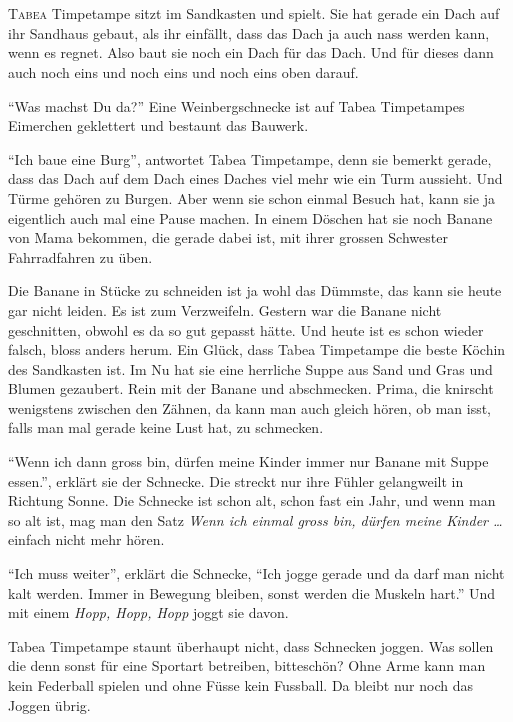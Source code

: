 \chapter*{}
\lettrine[lines=3]{\color{DeepPink}T}{abea} Timpetampe sitzt im Sandkasten und spielt. Sie hat gerade ein Dach auf ihr Sandhaus gebaut, als ihr einfällt, dass das Dach ja auch nass werden kann, wenn es regnet. Also baut sie noch ein Dach für das Dach. Und für dieses dann auch noch eins und noch eins und noch eins oben darauf.

\enquote{Was machst Du da?} Eine Weinbergschnecke ist auf Tabea Timpetampes Eimerchen geklettert und bestaunt das Bauwerk. 

\enquote{Ich baue eine Burg}, antwortet Tabea Timpetampe, denn sie bemerkt gerade, dass das Dach auf dem Dach eines Daches viel mehr wie ein Turm aussieht. Und Türme gehören zu Burgen. Aber wenn sie schon einmal Besuch hat, kann sie ja eigentlich auch mal eine Pause machen. In einem Döschen hat sie noch Banane von Mama bekommen, die gerade dabei ist, mit ihrer grossen Schwester Fahrradfahren zu üben. 

Die Banane in Stücke zu schneiden ist ja wohl das Dümmste, das kann sie heute gar nicht leiden. Es ist zum Verzweifeln. Gestern war die Banane nicht geschnitten, obwohl es da so gut gepasst hätte. Und heute ist es schon wieder falsch, bloss anders herum. Ein Glück, dass Tabea Timpetampe die beste Köchin des Sandkasten ist. Im Nu hat sie eine herrliche Suppe aus Sand und Gras und Blumen gezaubert. Rein mit der Banane und abschmecken. Prima, die knirscht wenigstens zwischen den Zähnen, da kann man auch gleich hören, ob man isst, falls man mal gerade keine Lust hat, zu schmecken.

\enquote{Wenn ich dann gross bin, dürfen meine Kinder immer nur Banane mit Suppe essen.}, erklärt sie der Schnecke. Die streckt nur ihre Fühler gelangweilt in Richtung Sonne. Die Schnecke ist schon alt, schon fast ein Jahr, und wenn man so alt ist, mag man den Satz \textit{Wenn ich einmal gross bin, dürfen meine Kinder \dots} einfach nicht mehr hören.

\enquote{Ich muss weiter}, erklärt die Schnecke, \enquote{Ich jogge gerade und da darf man nicht kalt werden. Immer in Bewegung bleiben, sonst werden die Muskeln hart.} Und mit einem \textit{Hopp, Hopp, Hopp} joggt sie  davon.

Tabea Timpetampe staunt überhaupt nicht, dass Schnecken joggen. Was sollen die denn sonst für eine Sportart betreiben, bitteschön? Ohne Arme kann man kein Federball spielen und ohne Füsse kein Fussball. Da bleibt nur noch das Joggen übrig. 

